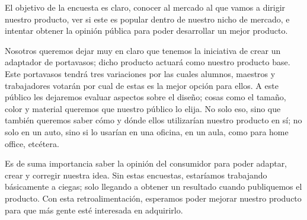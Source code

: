 \tab El objetivo de la encuesta es claro, conocer al mercado al que vamos a dirigir nuestro producto, ver si este es popular dentro de nuestro nicho de mercado, e intentar obtener la opinión pública para poder desarrollar un mejor producto.

\tab Nosotros queremos dejar muy en claro que tenemos la iniciativa de crear un adaptador de portavasos; dicho producto actuará como nuestro producto base. Este portavasos tendrá tres variaciones por las cuales alumnos, maestros y trabajadores votarán por cual de estas es la mejor opción para ellos. A este público les dejaremos evaluar aspectos sobre el diseño; cosas como el tamaño, color y material queremos que nuestro público lo elija. No solo eso, sino que también queremos saber cómo y dónde ellos utilizarían nuestro producto en sí; no solo en un auto, sino si lo usarían en una oficina, en un aula, como para home office, etcétera.

\tab Es de suma importancia saber la opinión del consumidor para poder adaptar, crear y corregir nuestra idea. Sin estas encuestas, estaríamos trabajando básicamente a ciegas; solo llegando a obtener un resultado cuando publiquemos el producto. Con esta retroalimentación, esperamos poder mejorar nuestro producto para que más gente esté interesada en adquirirlo. 
